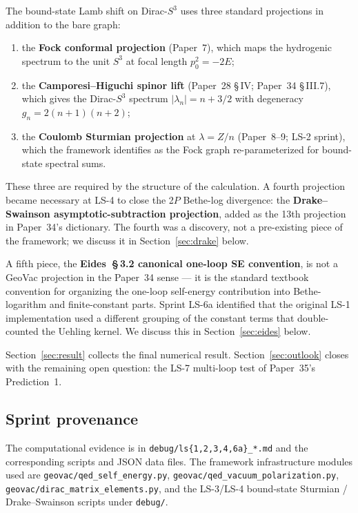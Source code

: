 \documentclass[11pt]{article}
\begin{document}
The bound-state Lamb shift on Dirac-$S^3$ uses three standard
projections in addition to the bare graph:

\begin{enumerate}
\setlength\itemsep{0pt}
\item the \textbf{Fock conformal projection} (Paper~7), which maps the
hydrogenic spectrum to the unit $S^3$ at focal length $p_0^2 = -2E$;
\item the \textbf{Camporesi--Higuchi spinor lift} (Paper~28
\S\,IV; Paper~34 \S\,III.7), which gives the Dirac-$S^3$ spectrum
$|\lambda_n| = n + 3/2$ with degeneracy $g_n = 2(n+1)(n+2)$;
\item the \textbf{Coulomb Sturmian projection} at $\lambda = Z/n$
(Paper~8--9; LS-2 sprint), which the framework identifies as the
Fock graph re-parameterized for bound-state spectral sums.
\end{enumerate}

These three are required by the structure of the calculation.  A
fourth projection became necessary at LS-4 to close the 2$P$ Bethe-log
divergence: the \textbf{Drake--Swainson asymptotic-subtraction
projection}, added as the 13th projection in Paper~34's
dictionary.  The fourth was a discovery, not a pre-existing piece of
the framework; we discuss it in Section~\ref{sec:drake} below.

A fifth piece, the \textbf{Eides~\S\,3.2 canonical one-loop SE
convention}, is not a GeoVac projection in the Paper~34 sense --- it
is the standard textbook convention for organizing the one-loop
self-energy contribution into Bethe-logarithm and finite-constant
parts.  Sprint LS-6a identified that the original LS-1 implementation
used a different grouping of the constant terms that double-counted
the Uehling kernel.  We discuss this in Section~\ref{sec:eides}
below.

Section~\ref{sec:result} collects the final numerical result.
Section~\ref{sec:outlook} closes with the remaining open question:
the LS-7 multi-loop test of Paper~35's Prediction~1.

\subsection*{Sprint provenance}
The computational evidence is in
\texttt{debug/ls\{1,2,3,4,6a\}\_*.md} and the corresponding scripts
and JSON data files.  The framework infrastructure modules used are
\texttt{geovac/qed\_self\_energy.py}, \texttt{geovac/qed\_vacuum\_polarization.py},
\texttt{geovac/dirac\_matrix\_elements.py}, and the LS-3/LS-4 bound-state
Sturmian / Drake--Swainson scripts under \texttt{debug/}.
\end{document}
